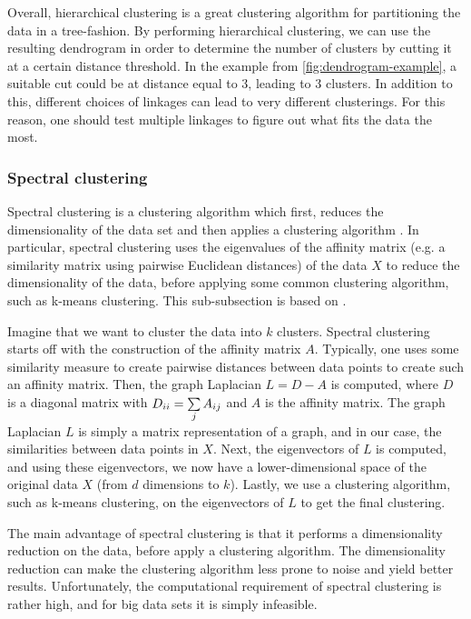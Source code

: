 Overall, hierarchical clustering is a great clustering algorithm for partitioning the data in a tree-fashion. By performing hierarchical clustering, we can use the resulting dendrogram in order to determine the number of clusters by cutting it at a certain distance threshold. In the example from \cref{fig:dendrogram-example}, a suitable cut could be at distance equal to 3, leading to 3 clusters. In addition to this, different choices of linkages can lead to very different clusterings. For this reason, one should test multiple linkages to figure out what fits the data the most.

\subsubsection{Spectral clustering}
\label{sec:spectral-clustering}
Spectral clustering is a clustering algorithm which first, reduces the dimensionality of the data set and then applies a clustering algorithm \cite{Andrew2002}. In particular, spectral clustering uses the eigenvalues of the affinity matrix (e.g. a similarity matrix using pairwise Euclidean distances) of the data $X$ to reduce the dimensionality of the data, before applying some common clustering algorithm, such as k-means clustering. This sub-subsection is based on \cite{Andrew2002}.

Imagine that we want to cluster the data into $k$ clusters. Spectral clustering starts off with the construction of the affinity matrix $A$. Typically, one uses some similarity measure to create pairwise distances between data points to create such an affinity matrix. Then, the graph Laplacian $L = D - A$ is computed, where $D$ is a diagonal matrix with $D_{ii} = \sum\limits_{j}^{} A_{ij}$ and $A$ is the affinity matrix. The graph Laplacian $L$ is simply a matrix representation of a graph, and in our case, the similarities between data points in $X$. Next, the eigenvectors of $L$ is computed, and using these eigenvectors, we now have a lower-dimensional space of the original data $X$ (from $d$ dimensions to $k$). Lastly, we use a clustering algorithm, such as k-means clustering, on the eigenvectors of $L$ to get the final clustering.

The main advantage of spectral clustering is that it performs a dimensionality reduction on the data, before apply a clustering algorithm. The dimensionality reduction can make the clustering algorithm less prone to noise and yield better results. Unfortunately, the computational requirement of spectral clustering is rather high, and for big data sets it is simply infeasible.

